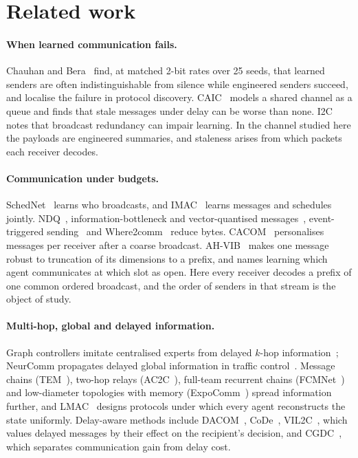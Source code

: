\documentclass[11pt]{article}
\theoremstyle{definition}
\begin{document}
\section{Related work}\label{sec:related}
\paragraph{When learned communication fails.} Chauhan and Bera~\cite{chauhan2026} find, at matched 2-bit rates over 25
seeds, that learned senders are often indistinguishable from silence while engineered senders succeed, and localise the
failure in protocol discovery. CAIC~\cite{caic} models a shared channel as a queue and finds that stale messages under
delay can be worse than none. I2C~\cite{i2c} notes that broadcast redundancy can impair learning. In the channel studied
here the payloads are engineered summaries, and staleness arises from which packets each receiver decodes.
\paragraph{Communication under budgets.} SchedNet~\cite{schednet} learns who broadcasts, and IMAC~\cite{imac} learns
messages and schedules jointly. NDQ~\cite{ndq}, information-bottleneck and vector-quantised messages~\cite{ibvq},
event-triggered sending~\cite{etcnet} and Where2comm~\cite{where2comm} reduce bytes. CACOM~\cite{cacom} personalises
messages per receiver after a coarse broadcast. AH-VIB~\cite{ahvib} makes one message robust to truncation of its
dimensions to a prefix, and names learning which agent communicates at which slot as open. Here every receiver decodes a
prefix of one common ordered broadcast, and the order of senders in that stream is the object of study.
\paragraph{Multi-hop, global and delayed information.} Graph controllers imitate centralised experts from delayed $k$-hop
information~\cite{gama2022,tolstaya2019}; NeurComm propagates delayed global information in traffic control~\cite{neurcomm}.
Message chains (TEM~\cite{tem}), two-hop relays (AC2C~\cite{ac2c}), full-team recurrent chains (FCMNet~\cite{fcmnet}) and
low-diameter topologies with memory (ExpoComm~\cite{expocomm}) spread information further, and LMAC~\cite{lmac} designs
protocols under which every agent reconstructs the state uniformly. Delay-aware methods include DACOM~\cite{dacom},
CoDe~\cite{code}, VIL2C~\cite{vil2c}, which values delayed messages by their effect on the recipient's decision, and
CGDC~\cite{cgdc}, which separates communication gain from delay cost.
\end{document}
